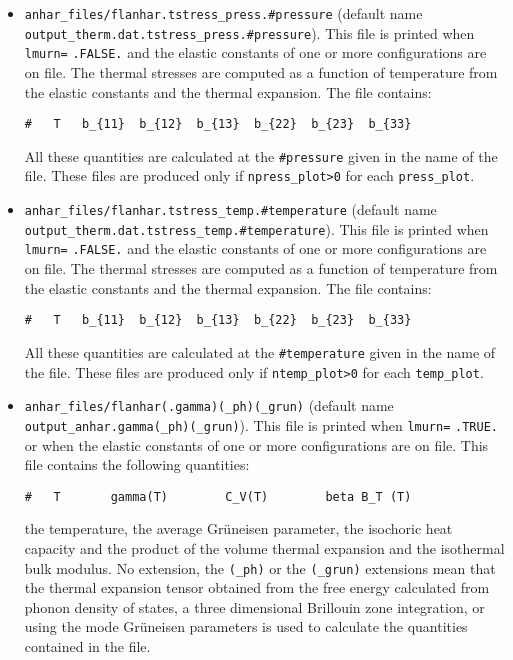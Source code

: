 \documentclass[12pt,a4paper,twoside]{report}
\begin{document}
\begin{itemize}
\item
\texttt{anhar\_files/flanhar.tstress\_press.\#pressure} (default name \\
\texttt{output\_therm.dat.tstress\_press.\#pressure}).
This file is printed when \texttt{lmurn=} \texttt{.FALSE.} and the 
elastic constants 
of one or more configurations are on file.
The thermal stresses are computed as a function of temperature from the
elastic constants and the thermal expansion.
The file contains:
\begin{verbatim}
#   T   b_{11}  b_{12}  b_{13}  b_{22}  b_{23}  b_{33}
\end{verbatim}
All these quantities are calculated at the \texttt{\#pressure} given
in the name of the file.
These files are produced only if \texttt{npress\_plot>0} for each
\texttt{press\_plot}.

\item
\texttt{anhar\_files/flanhar.tstress\_temp.\#temperature} (default name \\
\texttt{output\_therm.dat.tstress\_temp.\#temperature}).
This file is printed when \texttt{lmurn=} \texttt{.FALSE.} and the 
elastic constants 
of one or more configurations are on file.
The thermal stresses are computed as a function of temperature from the
elastic constants and the thermal expansion.
The file contains:
\begin{verbatim}
#   T   b_{11}  b_{12}  b_{13}  b_{22}  b_{23}  b_{33}
\end{verbatim}
All these quantities are calculated at the \texttt{\#temperature} given
in the name of the file.
These files are produced only if \texttt{ntemp\_plot>0} for each
\texttt{temp\_plot}.

\item 
\texttt{anhar\_files/flanhar(.gamma)(\_ph)(\_grun)} 
(default name \\ \texttt{output\_anhar.gamma(\_ph)(\_grun)}). 
This file is printed
when \texttt{lmurn=} \texttt{.TRUE.} or when the elastic
constants of one or more configurations are on file.
This file contains the following quantities:
\begin{verbatim}
#   T       gamma(T)        C_V(T)        beta B_T (T)    
\end{verbatim}
the temperature, the average Gr\"uneisen parameter, the isochoric
heat capacity and the product of the volume thermal expansion and the
isothermal bulk modulus.
No extension, the \texttt{(\_ph)} or the \texttt{(\_grun)}
extensions mean that the thermal expansion tensor obtained from the
free energy calculated from phonon density of states,
a three dimensional Brillouin zone integration, or using the
mode Gr\"uneisen parameters is used to calculate the quantities 
contained in the file.


\end{itemize}
\end{document}

